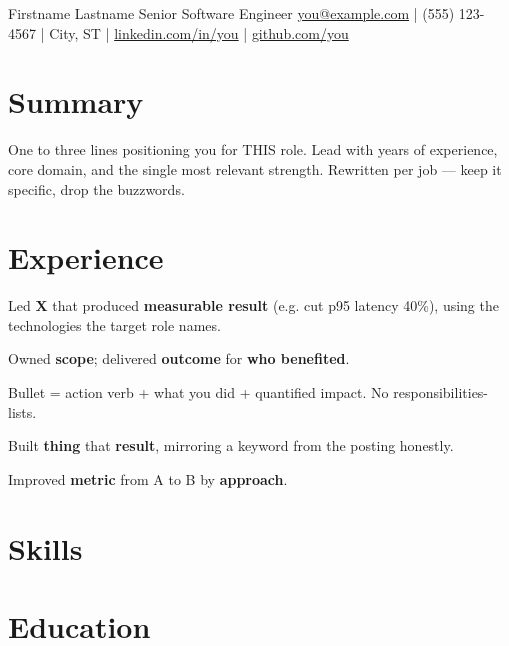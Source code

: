 \documentclass{resume}
\begin{document}
\resumeheader
  {Firstname Lastname}
  {Senior Software Engineer}
  {%
    \href{mailto:you@example.com}{you@example.com} \quad|\quad
    (555) 123-4567 \quad|\quad
    City, ST \quad|\quad
    \href{https://linkedin.com/in/you}{linkedin.com/in/you} \quad|\quad
    \href{https://github.com/you}{github.com/you}%
  }

\section{Summary}
One to three lines positioning you for THIS role. Lead with years of experience,
core domain, and the single most relevant strength. Rewritten per job --- keep it
specific, drop the buzzwords.

\section{Experience}

\begin{bullets}
  \item Led \textbf{X} that produced \textbf{measurable result} (e.g. cut p95 latency 40\%),
        using the technologies the target role names.
  \item Owned \textbf{scope}; delivered \textbf{outcome} for \textbf{who benefited}.
  \item Bullet = action verb + what you did + quantified impact. No responsibilities-lists.
\end{bullets}

\begin{bullets}
  \item Built \textbf{thing} that \textbf{result}, mirroring a keyword from the posting honestly.
  \item Improved \textbf{metric} from A to B by \textbf{approach}.
\end{bullets}

\section{Skills}

\section{Education}
\end{document}
